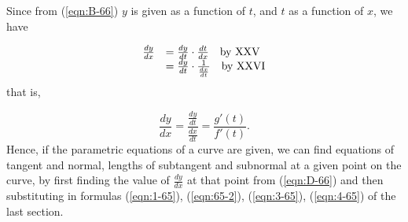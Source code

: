 Since from (\ref{eqn:B-66}) $y$ is given as a function of $t$, 
and $t$ as a function of $x$, we have

\[
\begin{array}{ll}
\frac{dy}{dx} 
&	= \frac{dy}{dt} \cdot \frac{dt}{dx}
\ \ \ {\rm by\ XXV}\\
& 
= \frac{dy}{dt} \cdot \frac{1}{\frac{dx}{dt}}\ \ \ {\rm by\ XXVI}
\end{array}
\]
that is,

\begin{equation}
\frac{dy}{dx} 	= \frac{\frac{dy}{dt}}{\frac{dx}{dt}} 
= \frac{g'(t)}{f'(t)}.
\label{eqn:D-66}
\end{equation}	
Hence, if the parametric equations of a curve are given, 
we can find equations of tangent and normal, lengths of 
subtangent and subnormal at a given point on the curve, by 
first finding the value of $\frac{dy}{dx}$ at that point 
from (\ref{eqn:D-66}) 
and then substituting in formulas (\ref{eqn:1-65}), (\ref{eqn:65-2}), 
(\ref{eqn:3-65}), (\ref{eqn:4-65}) of the last section.

